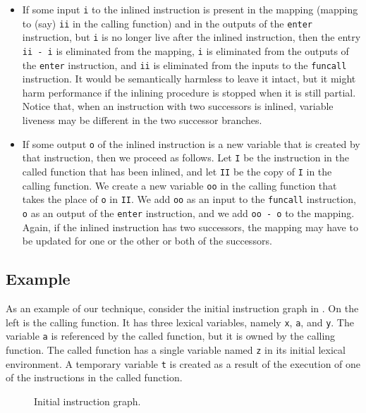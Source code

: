 \begin{itemize}
\item If some input \texttt{i} to the inlined instruction is present
  in the mapping (mapping to (say) \texttt{ii} in the calling
  function) and in the outputs of the \texttt{enter} instruction, but
  \texttt{i} is no longer live after the inlined instruction, then the
  entry \texttt{ii - i} is eliminated from the mapping, \texttt{i} is
  eliminated from the outputs of the \texttt{enter} instruction, and
  \texttt{ii} is eliminated from the inputs to the \texttt{funcall}
  instruction.  It would be semantically harmless to leave it intact,
  but it might harm performance if the inlining procedure is stopped
  when it is still partial.  Notice that, when an instruction with two
  successors is inlined, variable liveness may be different in the two
  successor branches.
\item If some output \texttt{o} of the inlined instruction is a new
  variable that is created by that instruction, then we proceed as
  follows.  Let \texttt{I} be the instruction in the called function
  that has been inlined, and let \texttt{II} be the copy of \texttt{I}
  in the calling function.  We create a new variable \texttt{oo} in
  the calling function that takes the place of \texttt{o} in
  \texttt{II}.  We add \texttt{oo} as an input to the \texttt{funcall}
  instruction, \texttt{o} as an output of the \texttt{enter}
  instruction, and we add \texttt{oo - o} to the mapping.  Again, if
  the inlined instruction has two successors, the mapping may have to
  be updated for one or the other or both of the successors.
\end{itemize}

\subsection{Example}

As an example of our technique, consider the initial instruction graph
in .  On the left is the calling function.  It has three
lexical variables, namely \texttt{x}, \texttt{a}, and \texttt{y}.  The
variable \texttt{a} is referenced by the called function, but it is
owned by the calling function.  The called function has a single
variable named \texttt{z} in its initial lexical environment.  A
temporary variable \texttt{t} is created as a result of the execution
of one of the instructions in the called function.

\begin{figure}
\begin{center}
\end{center}
\caption{\label{fig41}
Initial instruction graph.}
\end{figure}

